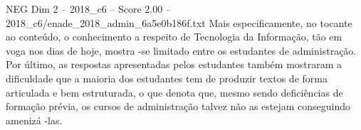 \begin{textsample}{NEG Dim 2 – 2018\_c6 – Score 2.00 – 2018\_c6/enade\_2018\_admin\_6a5e0b186f.txt}
Mais especificamente, no tocante ao conteúdo, o conhecimento a respeito de Tecnologia da Informação, tão em voga nos dias de hoje, mostra -se limitado entre os estudantes de administração.
Por último, as respostas apresentadas pelos estudantes também mostraram a dificuldade que a maioria dos estudantes tem de produzir textos de forma articulada e bem estruturada, o que denota que, mesmo sendo deficiências de formação prévia, os cursos de administração talvez não as estejam conseguindo amenizá -las.

\end{textsample}
